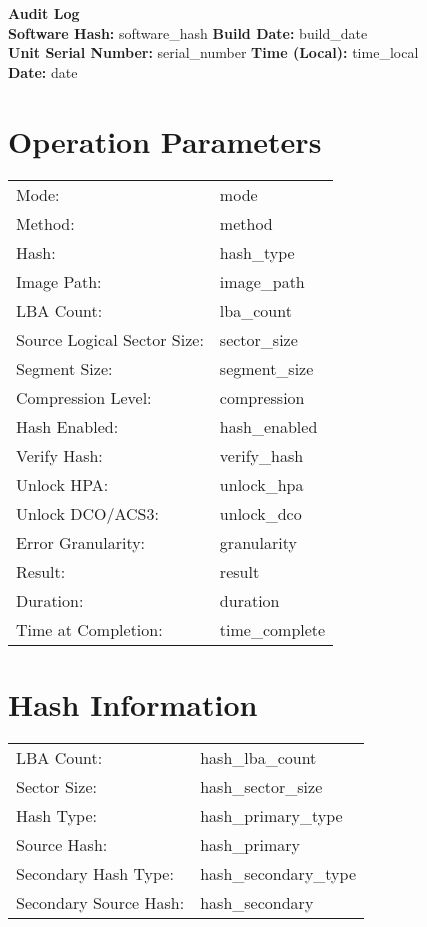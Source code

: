 \documentclass[a4paper,10pt]{article}
\begin{document}
\small

{\LARGE\textbf{Audit Log}}\\[1em]

\textbf{Software Hash:} {{ software_hash }} \hfill \textbf{Build Date:} {{ build_date }}\\
\textbf{Unit Serial Number:} {{ serial_number }} \hfill \textbf{Time (Local):} {{ time_local }}\\
\textbf{Date:} {{ date }}

\vspace{1em}
\section*{Operation Parameters}
\begin{tabular}{@{}ll}
Mode: & {{ mode }} \\
Method: & {{ method }} \\
Hash: & {{ hash_type }} \\
Image Path: & {{ image_path }} \\
LBA Count: & {{ lba_count }} \\
Source Logical Sector Size: & {{ sector_size }} \\
Segment Size: & {{ segment_size }} \\
Compression Level: & {{ compression }} \\
Hash Enabled: & {{ hash_enabled }} \\
Verify Hash: & {{ verify_hash }} \\
Unlock HPA: & {{ unlock_hpa }} \\
Unlock DCO/ACS3: & {{ unlock_dco }} \\
Error Granularity: & {{ granularity }} \\
Result: & {{ result }} \\
Duration: & {{ duration }} \\
Time at Completion: & {{ time_complete }} \\
\end{tabular}

\vspace{1em}
\section*{Hash Information}
\begin{tabular}{@{}ll}
LBA Count: & {{ hash_lba_count }} \\
Sector Size: & {{ hash_sector_size }} \\
Hash Type: & {{ hash_primary_type }} \\
Source Hash: & {{ hash_primary }} \\
Secondary Hash Type: & {{ hash_secondary_type }} \\
Secondary Source Hash: & {{ hash_secondary }} \\
\end{tabular}
\end{document}
